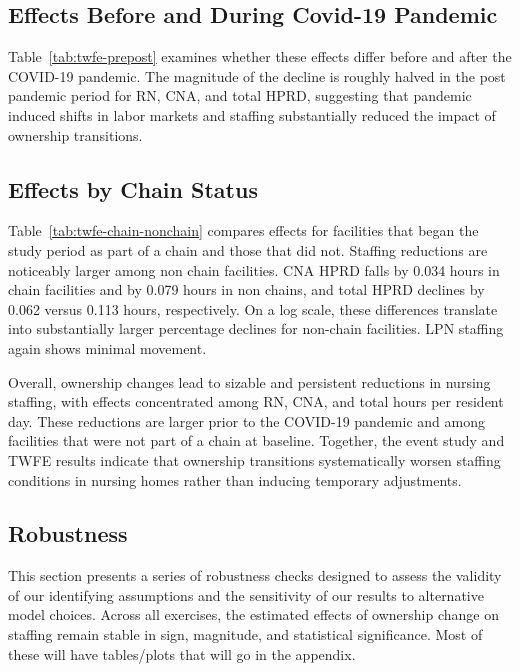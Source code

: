 \documentclass[12pt]{article}
\begin{document}

\FloatBarrier

\subsection{Effects Before and During Covid-19 Pandemic}

Table~\ref{tab:twfe-prepost} examines whether these effects differ before and after the COVID-19 pandemic. The magnitude of the decline is roughly halved in the post pandemic period for RN, CNA, and total HPRD, suggesting that pandemic induced shifts in labor markets and staffing substantially reduced the impact of ownership transitions.


\FloatBarrier

\subsection{Effects by Chain Status}

Table~\ref{tab:twfe-chain-nonchain} compares effects for facilities that began the study period as part of a chain and those that did not. Staffing reductions are noticeably larger among non chain facilities. CNA HPRD falls by 0.034 hours in chain facilities and by 0.079 hours in non chains, and total HPRD declines by 0.062 versus 0.113 hours, respectively. On a log scale, these differences translate into substantially larger percentage declines for non-chain facilities. LPN staffing again shows minimal movement.


\FloatBarrier

Overall, ownership changes lead to sizable and persistent reductions in nursing staffing, with effects concentrated among RN, CNA, and total hours per resident day. These reductions are larger prior to the COVID-19 pandemic and among facilities that were not part of a chain at baseline. Together, the event study and TWFE results indicate that ownership transitions systematically worsen staffing conditions in nursing homes rather than inducing temporary adjustments.

\subsection{Robustness}

This section presents a series of robustness checks designed to assess the validity of our identifying assumptions and the sensitivity of our results to alternative model choices. Across all exercises, the estimated effects of ownership change on staffing remain stable in sign, magnitude, and statistical significance. Most of these will have tables/plots that will go in the appendix.
\end{document}
